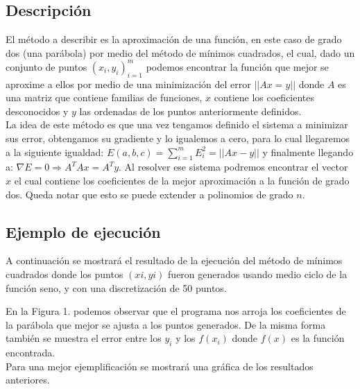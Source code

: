 \documentclass[12pt]{article}
\begin{document}
\subsection{Descripción}
El método a describir es la aproximación de una función, en este caso de grado dos (una parábola) por medio del método de mínimos cuadrados, el cual, dado un conjunto de puntos ${(x_i, y_i)_{i=1}^{m}}$ podemos encontrar la función que mejor se aproxime a ellos por medio de una minimización del error $||Ax=y||$ donde $A$ es una matriz que contiene familias de funciones, $x$ contiene los coeficientes desconocidos y $y$ las ordenadas de los puntos anteriormente definidos.\\
La idea de este método es que una vez tengamos definido el sistema a minimizar sus error, obtengamos su gradiente y lo igualemos a cero, para lo cual llegaremos a la siguiente igualdad: $E(a, b, c) = \sum_{i=1}^{m}E_{i}^{2} = ||Ax-y||$ y finalmente llegando a: $\nabla E = 0 \Rightarrow A^T Ax = A^T y$. Al resolver ese sistema podremos encontrar el vector $x$ el cual contiene los coeficientes de la mejor aproximación a la función de grado dos. Queda notar que esto se puede extender a polinomios de grado $n$.

\subsection{Ejemplo de ejecución}
A continuación se mostrará el resultado de la ejecución del método de mínimos cuadrados donde los puntos $(xi, yi)$ fueron generados usando medio ciclo de la función seno, y con una discretización de 50 puntos.\\

\begin{figure}[H]
	\centering
	\hfill
\end{figure}

En la Figura 1. podemos observar que el programa nos arroja los coeficientes de la parábola que mejor se ajusta a los puntos generados. De la misma forma también se muestra el error entre los $y_i$ y los $f(x_i)$ donde $f(x)$ es la función encontrada.\\

Para una mejor ejemplificación se mostrará una gráfica de los resultados anteriores.\\
\end{document}
